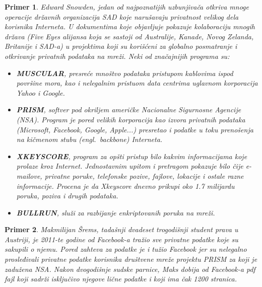 \documentclass[a4paper]{article}
\newtheorem{primer}{Primer}[section]
\begin{document}
\begin{primer}
	Edward Snowden, jedan od najpoznatijih uzbunjivača otkriva mnoge operacije državnih organizacija SAD koje narušavaju privatnost velikog dela korisnika Interneta. U dokumentima koje objavljuje pokazuje kolaboraciju mnogih država (Five Eyes alijansa koja se sastoji od Australije, Kanade, Novog Zelanda, Britanije i SAD-a\cite{?}) u projektima koji su korišćeni za globalno posmatranje i otkrivanje privatnih podataka na mreži. Neki od značajnijih programa su: \cite{?}
\begin{itemize}
	\item \textbf{MUSCULAR}, presreće mnoštvo podataka pristupom kablovima ispod površine mora, kao i nelegalnim pristuom data centrima uglavnom korporacija Yahoo i Google. \cite{?}
	\item \textbf{PRISM}, softver pod okriljem američke Nacionalne Sigurnosne Agencije (NSA). Program je pored velikih korporacija kao izvora privatnih podataka (Microsoft, Facebook, Google, Apple...) presretao i podatke u toku prenošenja na kičmenom stubu (engl.~{\em backbone}) Interneta. \cite{?}
	\item \textbf{XKEYSCORE}, program za opšti pristup bilo kakvim informacijama koje prolaze kroz Internet. Jednostavnim upitom i pretragom pokazuje bilo čije e-mailove, privatne poruke, telefonske pozive, fajlove, lokacije i ostale razne informacije. Procena je da Xkeyscore dnevno prikupi oko 1.7 milijardu poruka, poziva i drugih podataka. \cite{?}
	\item \textbf{BULLRUN}, služi za razbijanje enkriptovanih poruka na mreži. \cite{?}
\end{itemize}
\end{primer}

\begin{primer}
	Makmilijan Šrems, tadašnji dvadeset trogodišnji student prava u
Austriji, je 2011-te godine od Facebook-a tražio sve privatne podatke koje su sakupili o njemu. Pored zahteva za podatke je i tužio Facebook jer su nelegalno prosleđivali privatne podatke korisnika društvene mreže projektu PRISM\cite{?} za koji je zadužena NSA. Nakon dvogodišnje sudske parnice, Maks dobija od Facebook-a pdf fajl koji sadrži isključivo njegove lične podatke i koji ima čak 1200 stranica. \cite{?}
\end{primer}
\end{document}
